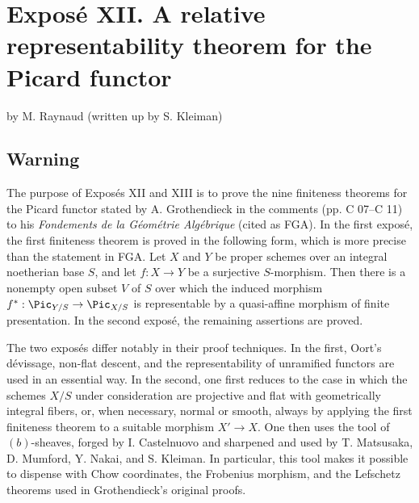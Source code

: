 \providecommand{\Hom}{\operatorname{Hom}}
\providecommand{\Isom}{\operatorname{Isom}}
\providecommand{\Coker}{\operatorname{Coker}}
\providecommand{\Ass}{\operatorname{Ass}}
\providecommand{\sgacircled}[1]{\tikz[baseline=(char.base)]\node[shape=circle,draw,inner sep=.35pt](char){\mbox{\scriptsize #1}};}
\newpage
\section*{Expos\'e XII. A relative representability theorem for the Picard functor}
\begin{center}
by M. Raynaud (written up by S. Kleiman)
\end{center}

\subsection*{Warning}

The purpose of Expos\'es XII and XIII is to prove the nine finiteness theorems
for the Picard functor stated by A. Grothendieck in the comments
(pp. C 07--C 11) to his \emph{Fondements de la G\'eom\'etrie Alg\'ebrique}
(cited as FGA). In the first expos\'e, the first finiteness theorem is proved
in the following form, which is more precise than the statement in FGA. Let
$X$ and $Y$ be proper schemes over an integral noetherian base $S$, and let
$f:X\to Y$ be a surjective $S$-morphism. Then there is a nonempty open subset
$V$ of $S$ over which the induced morphism
$f^*:\Pic_{Y/S}\to\Pic_{X/S}$ is representable by a quasi-affine morphism of
finite presentation. In the second expos\'e, the remaining assertions are
proved.

The two expos\'es differ notably in their proof techniques. In the first,
Oort's d\'evissage, non-flat descent, and the representability of unramified
functors are used in an essential way. In the second, one first reduces to
the case in which the schemes $X/S$ under consideration are projective and
flat with geometrically integral fibers, or, when necessary, normal or
smooth, always by applying the first finiteness theorem to a suitable
morphism $X'\to X$. One then uses the tool of $(b)$-sheaves, forged by
I. Castelnuovo and sharpened and used by T. Matsusaka, D. Mumford, Y. Nakai,
and S. Kleiman. In particular, this tool makes it possible to dispense with
Chow coordinates, the Frobenius morphism, and the Lefschetz theorems used in
Grothendieck's original proofs.

